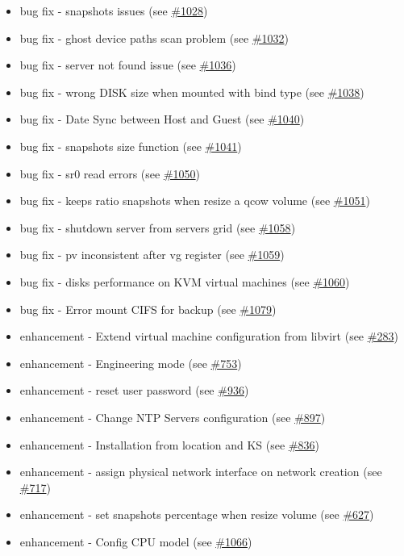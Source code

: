 \begin{itemize}
    \item bug fix - snapshots issues (see \href{https://srcmaster.eurotux.com/pm/p/etva/ticket/1028}{\#1028})
    \item bug fix - ghost device paths scan problem (see \href{https://srcmaster.eurotux.com/pm/p/etva/ticket/1032}{\#1032})
    \item bug fix - server not found issue (see \href{https://srcmaster.eurotux.com/pm/p/etva/ticket/1036}{\#1036})
    \item bug fix - wrong DISK size when mounted with bind type (see \href{https://srcmaster.eurotux.com/pm/p/etva/ticket/1038}{\#1038})
    \item bug fix - Date Sync between Host and Guest (see \href{https://srcmaster.eurotux.com/pm/p/etva/ticket/1040}{\#1040})
    \item bug fix - snapshots size function (see \href{https://srcmaster.eurotux.com/pm/p/etva/ticket/1041}{\#1041})
    \item bug fix - sr0 read errors (see \href{https://srcmaster.eurotux.com/pm/p/etva/ticket/1050}{\#1050})
    \item bug fix - keeps ratio snapshots when resize a qcow volume (see \href{https://srcmaster.eurotux.com/pm/p/etva/ticket/1051}{\#1051})
    \item bug fix - shutdown server from servers grid (see \href{https://srcmaster.eurotux.com/pm/p/etva/ticket/1058}{\#1058})
    \item bug fix - pv inconsistent after vg register (see \href{https://srcmaster.eurotux.com/pm/p/etva/ticket/1059}{\#1059})
    \item bug fix - disks performance on KVM virtual machines (see \href{https://srcmaster.eurotux.com/pm/p/etva/ticket/1060}{\#1060})
    \item bug fix - Error mount CIFS for backup (see \href{https://srcmaster.eurotux.com/pm/p/etva/ticket/1079}{\#1079})
    \item enhancement - Extend virtual machine configuration from libvirt (see \href{https://srcmaster.eurotux.com/pm/p/etva/ticket/283}{\#283})
    \item enhancement - Engineering mode (see \href{https://srcmaster.eurotux.com/pm/p/etva/ticket/753}{\#753})
    \item enhancement - reset user password (see \href{https://srcmaster.eurotux.com/pm/p/etva/ticket/936}{\#936})
    \item enhancement - Change NTP Servers configuration (see \href{https://srcmaster.eurotux.com/pm/p/etva/ticket/897}{\#897})
    \item enhancement - Installation from location and KS (see \href{https://srcmaster.eurotux.com/pm/p/etva/ticket/836}{\#836})
    \item enhancement - assign physical network interface on network creation (see \href{https://srcmaster.eurotux.com/pm/p/etva/ticket/717}{\#717})
    \item enhancement - set snapshots percentage when resize volume (see \href{https://srcmaster.eurotux.com/pm/p/etva/ticket/627}{\#627})
    \item enhancement - Config CPU model (see \href{https://srcmaster.eurotux.com/pm/p/etva/ticket/1066}{\#1066})
\end{itemize}
